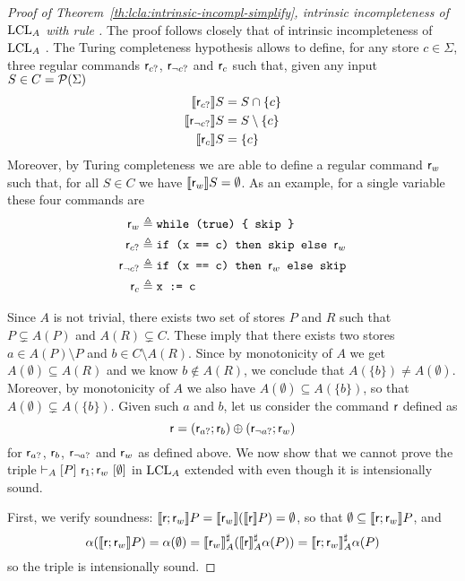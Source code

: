 \begin{proof}[Proof of Theorem~\ref{th:lcla:intrinsic-incompl-simplify}, intrinsic incompleteness of $\text{LCL}_A$ with rule ]
	The proof follows closely that of intrinsic incompleteness of $\text{LCL}_A$ \cite[Theorem~5.12]{BGGR21}.
	The Turing completeness hypothesis allows to define, for any store $c \in \Sigma$, three regular commands $\mathsf{r}_{c?}$, $\mathsf{r}_{\lnot c?}$ and $\mathsf{r}_{c}$ such that, given any input $S \in C = \mathcal{P}(\Sigma)$
	\begin{align*}
		\llbracket\mathsf{r}_{c?}\rrbracket S &= S \cap \{ c \} \\
		\llbracket\mathsf{r}_{\lnot c?}\rrbracket S &= S \setminus \{ c \} \\
		\llbracket\mathsf{r}_{c}\rrbracket S &= \{ c \}
	\end{align*}
	Moreover, by Turing completeness we are able to define a regular command $\mathsf{r}_w$ such that, for all $S \in C$ we have $\llbracket\mathsf{r}_w\rrbracket S = \emptyset$.
	As an example, for a single variable  these four commands are
	\begin{align*}
		\mathsf{r}_w  &\triangleq \texttt{while (true) \{ skip \}} \\
		\mathsf{r}_{c?} &\triangleq \texttt{if (x == c) then skip else } \mathsf{r}_w\\
		\mathsf{r}_{\lnot c?} &\triangleq \texttt{if (x == c) then }\mathsf{r}_w \texttt{ else skip} \\
		\mathsf{r}_{c} &\triangleq \texttt{x := c}
	\end{align*}
	
	Since $A$ is not trivial, there exists two set of stores $P$ and $R$ such that $P \subsetneq A(P)$ and $A(R) \subsetneq C$. These imply that there exists two stores $a \in A(P) \setminus P$ and $b \in C \setminus A(R)$. Since by monotonicity of $A$ we get $A(\emptyset) \subseteq A(R)$ and we know $b \notin A(R)$, we conclude that $A(\{ b \}) \neq A(\emptyset)$. Moreover, by monotonicity of $A$ we also have $A(\emptyset) \subseteq A(\{ b \})$, so that $A(\emptyset) \subsetneq A(\{ b \})$.
	Given such $a$ and $b$, let us consider the command $\mathsf{r}$ defined as
	\[
	\mathsf{r} = (\mathsf{r}_{a?}; \mathsf{r}_{b}) \oplus (\mathsf{r}_{\lnot a?}; \mathsf{r}_w)
	\]
	for $\mathsf{r}_{a?}$, $\mathsf{r}_{b}$, $\mathsf{r}_{\lnot a?}$ and $\mathsf{r}_w$ as defined above. We now show that we cannot prove the triple $\vdash_{A}\nobreak[P]~\mathsf{r}_1; \mathsf{r}_w~[\emptyset]$ in $\text{LCL}_A$ extended with  even though it is intensionally sound.
	
	First, we verify soundness: $\llbracket\mathsf{r}; \mathsf{r}_w\rrbracket P = \llbracket\mathsf{r}_w\rrbracket (\llbracket\mathsf{r}\rrbracket P) = \emptyset$, so that $\emptyset \subseteq \llbracket\mathsf{r}; \mathsf{r}_w\rrbracket P$, and
	\[
	\alpha(\llbracket\mathsf{r}; \mathsf{r}_w\rrbracket P) = \alpha(\emptyset) = \llbracket\mathsf{r}_w\rrbracket^{\sharp}_{A} (\llbracket\mathsf{r}\rrbracket^{\sharp}_{A} \alpha(P)) = \llbracket\mathsf{r}; \mathsf{r}_w\rrbracket^{\sharp}_{A} \alpha(P)
	\]
	so the triple is intensionally sound.
	

\end{proof}
